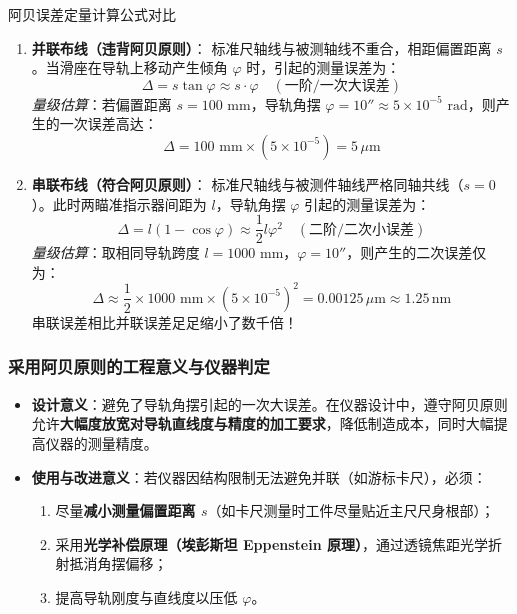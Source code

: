 \documentclass[11pt,a4paper]{ctexart}
\begin{document}
\begin{formulabox}{阿贝误差定量计算公式对比}
\begin{enumerate}[leftmargin=1.5em, itemsep=3pt]
    \item \textbf{并联布线（违背阿贝原则）}：
    标准尺轴线与被测轴线不重合，相距偏置距离 $s$。当滑座在导轨上移动产生倾角 $\varphi$ 时，引起的测量误差为：
    \begin{equation}
    \Delta = s \tan\varphi \approx s \cdot \varphi \quad (\text{一阶/一次大误差})
    \end{equation}
    \emph{量级估算}：若偏置距离 $s = 100\text{ mm}$，导轨角摆 $\varphi = 10'' \approx 5 \times 10^{-5}\text{ rad}$，则产生的一次误差高达：
    \[ \Delta = 100\text{ mm} \times (5 \times 10^{-5}) = 5\,\mu\text{m} \]
    
    \item \textbf{串联布线（符合阿贝原则）}：
    标准尺轴线与被测件轴线严格同轴共线（$s = 0$）。此时两瞄准指示器间距为 $l$，导轨角摆 $\varphi$ 引起的测量误差为：
    \begin{equation}
    \Delta = l (1 - \cos\varphi) \approx \frac{1}{2} l \varphi^2 \quad (\text{二阶/二次小误差})
    \end{equation}
    \emph{量级估算}：取相同导轨跨度 $l = 1000\text{ mm}$，$\varphi = 10''$，则产生的二次误差仅为：
    \[ \Delta \approx \frac{1}{2} \times 1000\text{ mm} \times (5 \times 10^{-5})^2 = 0.00125\,\mu\text{m} \approx 1.25\,\text{nm} \]
    串联误差相比并联误差足足缩小了数千倍！
\end{enumerate}
\end{formulabox}

\subsubsection{采用阿贝原则的工程意义与仪器判定}
\begin{itemize}[leftmargin=1.5em, itemsep=3pt]
    \item \textbf{设计意义}：避免了导轨角摆引起的一次大误差。在仪器设计中，遵守阿贝原则允许\textbf{大幅度放宽对导轨直线度与精度的加工要求}，降低制造成本，同时大幅提高仪器的测量精度。
    \item \textbf{使用与改进意义}：若仪器因结构限制无法避免并联（如游标卡尺），必须：
    \begin{enumerate}[label=(\alph*)]
        \item 尽量\textbf{减小测量偏置距离 $s$}（如卡尺测量时工件尽量贴近主尺尺身根部）；
        \item 采用\textbf{光学补偿原理（埃彭斯坦 Eppenstein 原理）}，通过透镜焦距光学折射抵消角摆偏移；
        \item 提高导轨刚度与直线度以压低 $\varphi$。
    \end{enumerate}
\end{itemize}
\end{document}
